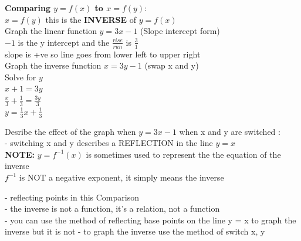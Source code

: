 \documentclass[10pt]{article}
\begin{document}
\textbf{Comparing \(y = f(x)\) to \(x = f(y)\)}: \\
\(x = f(y)\) this is the \textbf{INVERSE} of \(y = f(x)\) \\
Graph the linear function \(y = 3x-1\) (Slope intercept form) \\
\(-1\) is the y intercept and the \(\frac{rise}{run}\) is \(\frac{3}{1}\) \\
slope is +ve so line goes from lower left to upper right \\
Graph the inverse function \(x = 3y-1\) (swap x and y) \\
Solve for \(y\) \\
\(x+1 = 3y\) \\
\(\frac{x}{3} + \frac{1}{3}=\frac{3y}{3}\) \\
\(y =\frac{1}{3}x + \frac{1}{3}\)




Desribe the effect of the graph when \(y = 3x-1\) when x and y are switched : \\
- switching x and y describes a REFLECTION in the line \(y = x\) \\
\textbf{NOTE:} \(y = f^{-1}(x)\) is sometimes used to represent the the equation of the inverse \\
\(f^{-1}\) is NOT a negative exponent, it simply means the inverse


- reflecting points in this Comparison \\
- the inverse is not a function, it's a relation, not a function \\
- you can use the method of reflecting base points on the line y = x to graph the inverse but it is not
- to graph the inverse use the method of switch x, y
\end{document}
